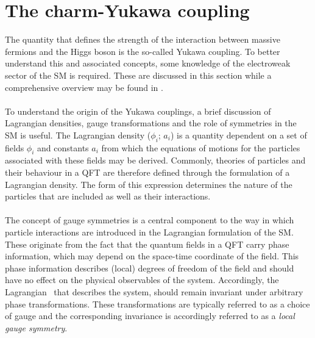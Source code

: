 \section{The charm-Yukawa coupling}
\label{sec:CharmYukawa}
The quantity that defines the strength of the interaction between massive fermions and the Higgs boson is the so-called Yukawa coupling. To better understand this and associated concepts, some knowledge of the electroweak sector of the SM is required. These are discussed in this section while a comprehensive overview may be found in \cite{WolfHiggs}. \\
\\
To understand the origin of the Yukawa couplings, a brief discussion of Lagrangian densities, gauge transformations and the role of symmetries in the SM is useful. The Lagrangian density \Lagr($\phi_i$; $a_i$) is a quantity dependent on a set of fields $\phi_i$ and constants $a_i$ from which the equations of motions for the particles associated with these fields may be derived. Commonly, theories of particles and their behaviour in a QFT are therefore defined through the formulation of a Lagrangian density. The form of this expression determines the nature of the particles that are included as well as their interactions. \\
\\
The concept of gauge symmetries is a central component to the way in which particle interactions are introduced in the Lagrangian formulation of the SM. These originate from the fact that the quantum fields in a QFT carry phase information, which may depend on the space-time coordinate of the field. This phase information describes (local) degrees of freedom of the field and should have no effect on the physical observables of the system. Accordingly, the Lagrangian \Lagr \, that describes the system, should remain invariant under arbitrary phase transformations. These transformations are typically referred to as a choice of gauge and the corresponding invariance is accordingly referred to as a \textit{local gauge symmetry}. \\
\\
